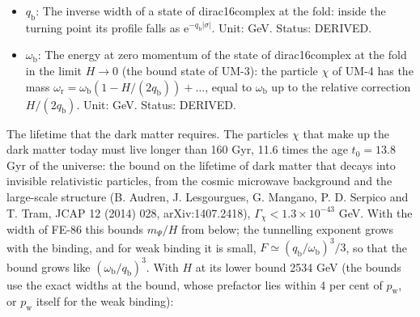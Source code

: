 \documentclass[
  10pt,
]{article}
\begin{document}
\begin{itemize}
  particle \(\chi\) in the limit \(H/q_{\mathrm{b}} \to 0\),
  \(\upsilon_{\mathrm{r}} = \omega_{\mathrm{r}}/m_\Psi\) that of the
  real part of its resonance. Unit: dimensionless. Status: DERIVED.
\item
  \(q_{\mathrm{b}}\): The inverse width of a state of dirac16complex at
  the fold: inside the turning point its profile falls as
  \(\mathrm{e}^{-q_{\mathrm{b}}\lvert\sigma\rvert}\). Unit: GeV. Status:
  DERIVED.
\item
  \(\omega_{\mathrm{b}}\): The energy at zero momentum of the state of
  dirac16complex at the fold in the limit \(H \to 0\) (the bound state
  of UM-3): the particle \(\chi\) of UM-4 has the mass
  \(\omega_{\mathrm{r}} = \omega_{\mathrm{b}}(1 - H/(2q_{\mathrm{b}})) + \dots\),
  equal to \(\omega_{\mathrm{b}}\) up to the relative correction
  \(H/(2q_{\mathrm{b}})\). Unit: GeV. Status: DERIVED.
\end{itemize}

The lifetime that the dark matter requires. The particles \(\chi\) that
make up the dark matter today must live longer than 160 Gyr, 11.6 times
the age \(t_0 = 13.8\) Gyr of the universe: the bound on the lifetime of
dark matter that decays into invisible relativistic particles, from the
cosmic microwave background and the large-scale structure (B. Audren, J.
Lesgourgues, G. Mangano, P. D. Serpico and T. Tram, JCAP 12 (2014) 028,
arXiv:1407.2418), \(\Gamma_\chi < 1.3\times10^{-43}\) GeV. With the
width of FE-86 this bounds \(m_\Psi/H\) from below; the tunnelling
exponent grows with the binding, and for weak binding it is small,
\(F \simeq (q_{\mathrm{b}}/\omega_{\mathrm{b}})^3/3\), so that the bound
grows like \((\omega_{\mathrm{b}}/q_{\mathrm{b}})^3\). With \(H\) at its
lower bound 2534 GeV (the bounds use the exact widths at the bound,
whose prefactor lies within 4 per cent of \(p_{\mathrm{w}}\), or
\(p_{\mathrm{w}}\) itself for the weak binding):
\end{document}
